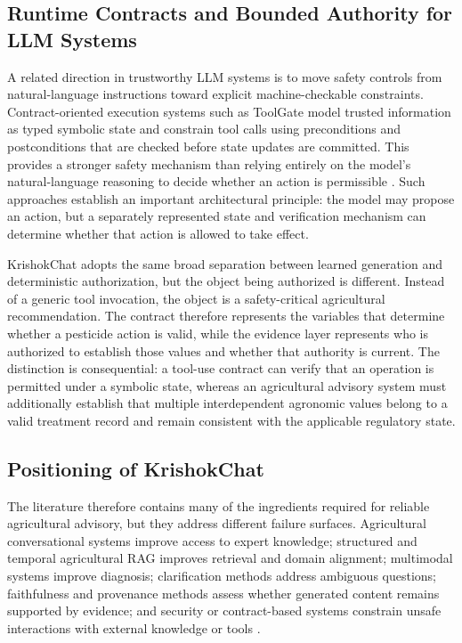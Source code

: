 \documentclass[a4paper,fleqn]{cas-dc}
\begin{document}
\subsection{Runtime Contracts and Bounded Authority for LLM Systems}
A related direction in trustworthy LLM systems is to move safety controls from natural-language instructions toward explicit machine-checkable constraints. Contract-oriented execution systems such as ToolGate model trusted information as typed symbolic state and constrain tool calls using preconditions and postconditions that are checked before state updates are committed. This provides a stronger safety mechanism than relying entirely on the model's natural-language reasoning to decide whether an action is permissible \citep{toolgate2026}. Such approaches establish an important architectural principle: the model may propose an action, but a separately represented state and verification mechanism can determine whether that action is allowed to take effect.

KrishokChat adopts the same broad separation between learned generation and deterministic authorization, but the object being authorized is different. Instead of a generic tool invocation, the object is a safety-critical agricultural recommendation. The contract therefore represents the variables that determine whether a pesticide action is valid, while the evidence layer represents who is authorized to establish those values and whether that authority is current. The distinction is consequential: a tool-use contract can verify that an operation is permitted under a symbolic state, whereas an agricultural advisory system must additionally establish that multiple interdependent agronomic values belong to a valid treatment record and remain consistent with the applicable regulatory state.

\subsection{Positioning of KrishokChat}
The literature therefore contains many of the ingredients required for reliable agricultural advisory, but they address different failure surfaces. Agricultural conversational systems improve access to expert knowledge; structured and temporal agricultural RAG improves retrieval and domain alignment; multimodal systems improve diagnosis; clarification methods address ambiguous questions; faithfulness and provenance methods assess whether generated content remains supported by evidence; and security or contract-based systems constrain unsafe interactions with external knowledge or tools \citep{farmerchat2024,krishokbondhu2025,tarag2026,smart2026,ragchecker2024,generateverify2025,saferag2025}.
\end{document}
